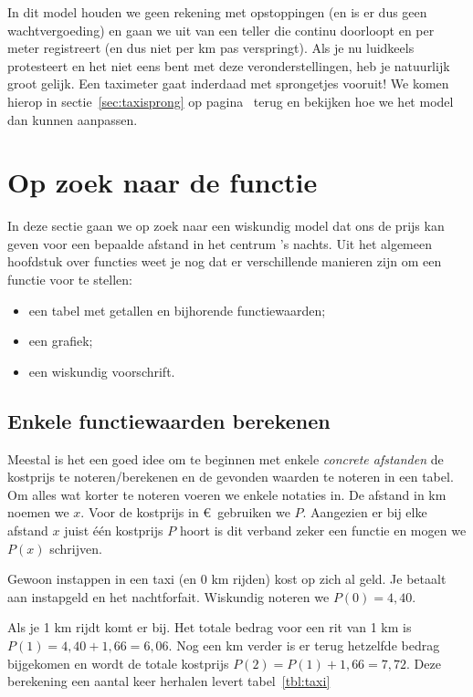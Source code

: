 In dit model houden we geen rekening met opstoppingen (en is er dus geen wachtvergoeding) en gaan we uit van een teller die continu doorloopt en per meter registreert (en dus niet per km pas verspringt). Als je nu luidkeels protesteert en het niet eens bent met deze veronderstellingen, heb je natuurlijk groot gelijk. Een taximeter gaat inderdaad met sprongetjes vooruit! We komen hierop in sectie~\ref{sec:taxisprong} op pagina~\pageref{sec:taxisprong} terug en bekijken hoe we het model dan kunnen aanpassen. 

\section{Op zoek naar de functie}
In deze sectie gaan we op zoek naar een wiskundig model dat ons de prijs kan geven voor een bepaalde afstand in het centrum 's nachts.
Uit het algemeen hoofdstuk over functies weet je nog dat er verschillende manieren zijn om een functie voor te stellen:
\begin{itemize}
\item een tabel met getallen en bijhorende functiewaarden;
\item een grafiek;
\item een wiskundig voorschrift.
\end{itemize}

\subsection{Enkele functiewaarden berekenen}
Meestal is het een goed idee om te beginnen met enkele \emph{concrete afstanden} de kostprijs te noteren/berekenen en de gevonden waarden te noteren in een tabel. Om alles wat korter te noteren voeren we enkele notaties in. De afstand in km noemen we $x$. Voor de kostprijs in \euro \ gebruiken we $P$. Aangezien er bij elke afstand $x$ juist één kostprijs $P$ hoort is dit verband zeker een functie en mogen we $P(x)$ schrijven.

Gewoon instappen in een taxi (en 0 km rijden) kost op zich al geld. Je betaalt  aan instapgeld en het nachtforfait. Wiskundig noteren we $P(0)=4,40$.

Als je 1 km rijdt komt er  bij. Het totale bedrag voor een rit van 1 km is $P(1)=4,40+1,66=6,06$. Nog een km verder is er terug hetzelfde bedrag bijgekomen en wordt de totale kostprijs $P(2)=P(1)+1,66=7,72$. Deze berekening een aantal keer herhalen levert tabel~\ref{tbl:taxi}

